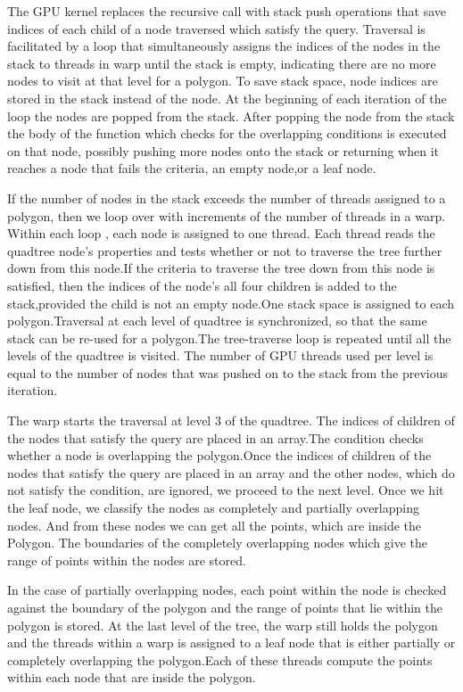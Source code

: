 \documentclass{article}
\begin{document}
The GPU kernel replaces the recursive call with stack push operations that save indices of each child of a node traversed which satisfy the query. Traversal is facilitated by a loop that simultaneously assigns the indices of the nodes in the stack to threads in warp until the stack is empty, indicating there are no more nodes to visit at that level for a polygon. To save stack space, node indices are stored in the stack instead of the node. At the beginning of each iteration of the loop the  nodes are popped from the stack. After popping the node from the stack the body of the function which checks for the overlapping conditions is executed on that node, possibly pushing more nodes onto the stack or returning when it reaches a node that fails the criteria, an empty node,or a leaf node.

If the number of nodes in the stack exceeds the number of threads assigned to a polygon, then we loop over with increments of the number of threads in a warp. Within each loop , each node is assigned to one thread.
Each thread reads the quadtree node's properties and tests whether or not to traverse the tree further down from this node.If the criteria to traverse the tree down from this node is satisfied, then the indices of the node's all four children is added to the stack,provided the child is not an empty node.One stack space is assigned to each polygon.Traversal at each level of quadtree is synchronized, so that the same stack can be re-used for a polygon.The tree-traverse loop is repeated until all the levels of the quadtree is visited.
The number of GPU threads used per level is equal to the number of nodes that was pushed on to the stack from the previous iteration.

The warp starts the traversal at level 3 of the quadtree. The indices of children of the nodes that satisfy the query are placed in an array.The condition checks whether a node is overlapping the polygon.Once the indices of children of the nodes that satisfy the query are placed in an array and the other nodes, which do not satisfy the condition, are ignored, we proceed to the next level.
Once we hit the leaf node, we classify the nodes as completely and partially overlapping nodes. And from these nodes we can get all the points, which are inside the Polygon.
The boundaries of the completely overlapping nodes  which give the range of points within the nodes are stored.

 In the case of partially overlapping nodes, each point within the node is checked against the boundary of the polygon and the range of points that lie within the polygon is stored. At the last level of the tree, the warp still holds the polygon and the threads within a warp is assigned to a leaf node that is either partially or completely overlapping the polygon.Each of these threads compute the points within each node that are inside the polygon.
\end{document}
